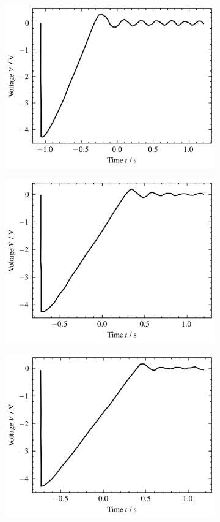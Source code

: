 \begin{figure}
	\addtocounter{figure}{-1}
	\centering
	\begin{subfigure}{0.48\columnwidth}
		\setcounter{subfigure}{4}
		\centering
		\includegraphics[width=0.8\linewidth]{src/figures/oscilloscope-each/p100-d0-oscilloscope.csv.png}
		\label{fig:oscilloscope-each-p100-d0}
	\end{subfigure}
	\begin{subfigure}{0.48\columnwidth}
		\centering
		\includegraphics[width=0.8\linewidth]{src/figures/oscilloscope-each/p100-d60-oscilloscope.csv.png}
		\label{fig:oscilloscope-each-p100-d60}
	\end{subfigure}
	\begin{subfigure}{0.48\columnwidth}
		\centering
		\includegraphics[width=0.8\linewidth]{src/figures/oscilloscope-each/p100-d80-oscilloscope.csv.png}

\end{subfigure}
\end{figure}
